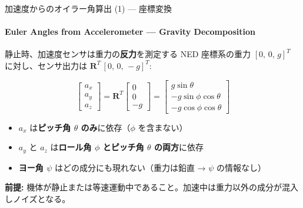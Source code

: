 \documentclass[aspectratio=169, 14pt]{beamer}
\begin{document}
\begin{frame}{加速度からのオイラー角算出 (1) --- 座標変換}
  \framesubtitle{Euler Angles from Accelerometer --- Gravity Decomposition}

  \begin{block}{静止時、加速度センサは重力の\textbf{反力}を測定する}
    {\small
    NED 座標系の重力 $[0,\,0,\,g]^T$ に対し、センサ出力は $\mathbf{R}^T\,[0,\,0,\,-g]^T$:
    }
  \end{block}

  {\small
  \[
  \begin{bmatrix} a_x \\ a_y \\ a_z \end{bmatrix}
  = \mathbf{R}^T
  \begin{bmatrix} 0 \\ 0 \\ -g \end{bmatrix}
  = \begin{bmatrix}
    g\sin\theta \\
    -g\sin\phi\cos\theta \\
    -g\cos\phi\cos\theta
  \end{bmatrix}
  \]
  }

  \vspace{-0.3em}

  {\small
  \begin{itemize}
    \item $a_x$ は\textbf{ピッチ角 $\theta$ のみ}に依存（$\phi$ を含まない）
    \item $a_y$ と $a_z$ は\textbf{ロール角 $\phi$ とピッチ角 $\theta$ の両方}に依存
    \item \textbf{ヨー角 $\psi$} はどの成分にも現れない（重力は鉛直 → $\psi$ の情報なし）
  \end{itemize}
  }

  \vspace{0.3em}

  {\footnotesize
  \textbf{前提:} 機体が静止または等速運動中であること。加速中は重力以外の成分が混入しノイズとなる。
  }
\end{frame}
\end{document}
